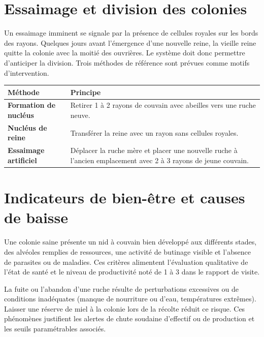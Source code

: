 \section{Essaimage et division des colonies}
Un essaimage imminent se signale par la présence de cellules royales sur les
bords des rayons. Quelques jours avant l'émergence d'une nouvelle reine, la
vieille reine quitte la colonie avec la moitié des ouvrières. Le système doit
donc permettre d'anticiper la division. Trois méthodes de référence sont
prévues comme motifs d'intervention.
\begin{xltabular}{\textwidth}{>{\bfseries}p{4.5cm} X}
\toprule
\textbf{Méthode} & \textbf{Principe} \\
\midrule
\endhead
Formation de nucléus & Retirer 1 à 2 rayons de couvain avec abeilles vers une ruche neuve. \\
Nucléus de reine & Transférer la reine avec un rayon sans cellules royales. \\
Essaimage artificiel & Déplacer la ruche mère et placer une nouvelle ruche à l'ancien emplacement avec 2 à 3 rayons de jeune couvain. \\
\bottomrule
\end{xltabular}

\section{Indicateurs de bien-être et causes de baisse}
Une colonie saine présente un nid à couvain bien développé aux différents
stades, des alvéoles remplies de ressources, une activité de butinage visible
et l'absence de parasites ou de maladies. Ces critères alimentent l'évaluation
qualitative de l'état de santé et le niveau de productivité noté de 1 à 3 dans
le rapport de visite.

La fuite ou l'abandon d'une ruche résulte de perturbations excessives ou de
conditions inadéquates (manque de nourriture ou d'eau, températures extrêmes).
Laisser une réserve de miel à la colonie lors de la récolte réduit ce risque.
Ces phénomènes justifient les alertes de chute soudaine d'effectif ou de
production et les seuils paramétrables associés.

